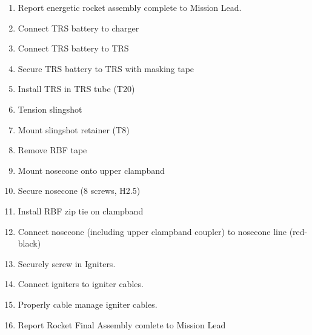 \begin{enumerate}[label=R\arabic*.]
    \item Report energetic rocket assembly complete to Mission Lead.\checkbox
    
    \item \label{rocket_final_start} Connect TRS battery to charger \checkbox
    \item Connect TRS battery to TRS \checkbox
    \item Secure TRS battery to TRS with masking tape \checkbox
    \item Install TRS in TRS tube (T20) \checkbox
    \item Tension slingshot \checkbox
    \item Mount slingshot retainer (T8) \checkbox
    \item Remove RBF tape \checkbox
    \item Mount nosecone onto upper clampband \checkbox
    \item Secure nosecone (8 screws, H2.5) \checkbox
    \item Install RBF zip tie on clampband \checkbox
    \item Connect nosecone (including upper clampband coupler) to nosecone line (red-black)\checkbox
    
    \item Securely screw in Igniters.\checkbox
    \item Connect igniters to igniter cables.\checkbox
    \item Properly cable manage igniter cables.\checkbox
    
    \item \label{rocket_final_end} Report Rocket Final Assembly comlete to Mission Lead\checkbox

\label{end_section_rocket}
\end{enumerate}
